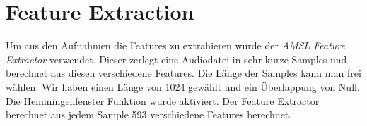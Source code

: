 \section{Feature Extraction}
\label{aafe}
Um aus den Aufnahmen die Features zu extrahieren wurde der \textit{AMSL Feature Extractor} verwendet. Dieser zerlegt eine Audiodatei in sehr kurze Samples und berechnet aus diesen verschiedene Features. Die Länge der Samples kann man frei wählen. Wir haben einen Länge von 1024 %
gewählt und ein Überlappung von Null. Die Hemmingenfenster Funktion wurde aktiviert. Der Feature Extractor berechnet aus jedem Sample 593 verschiedene Features berechnet. 
